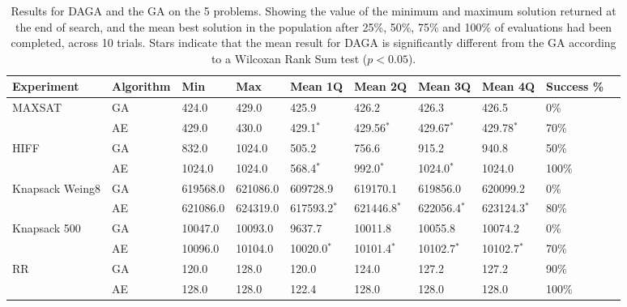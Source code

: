 \documentclass[runningheads,a4paper]{llncs}
\begin{document}
 \begin{table}[t!]
    \begin{tabular}{ | p{1.8cm} | l | l | l | l | l | l | l | l | p{1cm} |}
    \hline
    Experiment & Algorithm & Min & Max & Mean 1Q & Mean 2Q & Mean 3Q & Mean 4Q & Success \%\\ \hline
    MAXSAT & GA & 424.0 & 429.0 & 425.9 & 426.2 & 426.3 & 426.5 & 0\%\\ 
    & AE & 429.0 & 430.0 & 429.1\(^*\) & 429.56\(^*\) & 429.67\(^*\) & 429.78\(^*\) & 70\%\\ \hline
    HIFF & GA & 832.0 & 1024.0 & 505.2 & 756.6 & 915.2 & 940.8 & 50\%\\   
    & AE & 1024.0 & 1024.0 & 568.4\(^*\) & 992.0\(^*\) & 1024.0\(^*\) & 1024.0 & 100\%\\   \hline
    Knapsack Weing8 & GA & 619568.0 & 621086.0 & 609728.9 & 619170.1 & 619856.0 & 620099.2 & 0\%   \\
    & AE & 621086.0 & 624319.0 & 617593.2\(^*\) & 621446.8\(^*\) & 622056.4\(^*\) & 623124.3\(^*\) & 80\% \\\hline
    Knapsack 500 & GA & 10047.0 & 10093.0 & 9637.7 & 10011.8 & 10055.8 & 10074.2 & 0\%   \\
    & AE & 10096.0 & 10104.0 & 10020.0\(^*\) & 10101.4\(^*\) & 10102.7\(^*\) & 10102.7\(^*\) & 70\% \\\hline
    RR & GA & 120.0 & 128.0 & 120.0 & 124.0 & 127.2 & 127.2 & 90\%   \\
    & AE & 128.0 & 128.0 & 122.4 & 128.0 & 128.0 & 128.0 & 100\% \\\hline
    \end{tabular}
    \label{table:main_results}
    \caption{Results for DAGA and the GA on the 5 problems. Showing the value of the minimum and maximum solution returned at the end of search, and the mean best solution in the population after 25\%, 50\%, 75\% and 100\% of evaluations had been completed, across 10 trials. Stars indicate that the mean result for DAGA is significantly different from the GA according to a Wilcoxan Rank Sum test (\(p<0.05\)).}
\end{table}
\end{document}
